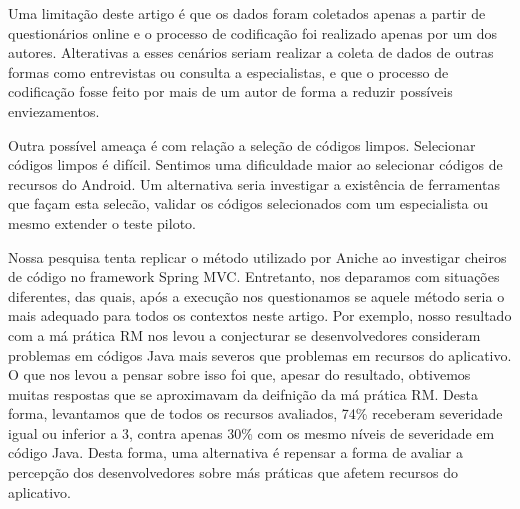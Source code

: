 Uma limitação deste artigo é que os dados foram coletados apenas a partir de questionários online e o processo de codificação foi realizado apenas por um dos autores. Alterativas a esses cenários seriam realizar a coleta de dados de outras formas como entrevistas ou consulta a especialistas, e que o processo de codificação fosse feito por mais de um autor de forma a reduzir possíveis enviezamentos.

Outra possível ameaça é com relação a seleção de códigos limpos. Selecionar códigos limpos é difícil. Sentimos uma dificuldade maior ao selecionar códigos de recursos do Android. Um alternativa seria investigar a existência de ferramentas que façam esta selecão, validar os códigos selecionados com um especialista ou mesmo extender o teste piloto. 

Nossa pesquisa tenta replicar o método utilizado por Aniche \cite{FinavaroAniche2016} ao investigar cheiros de código no framework Spring MVC. Entretanto, nos deparamos com situações diferentes, das quais, após a execução nos questionamos se aquele método seria o mais adequado para todos os contextos neste artigo. Por exemplo, nosso resultado com a má prática RM nos levou a conjecturar se desenvolvedores consideram problemas em códigos Java mais severos que problemas em recursos do aplicativo. O que nos levou a pensar sobre isso foi que, apesar do resultado, obtivemos muitas respostas que se aproximavam da deifnição da má prática RM. Desta forma, levantamos que de todos os recursos avaliados, 74\% receberam severidade igual ou inferior a 3, contra apenas 30\% com os mesmo níveis de severidade em código Java. Desta forma, uma alternativa é repensar a forma de avaliar a percepção dos desenvolvedores sobre más práticas que afetem recursos do aplicativo.
